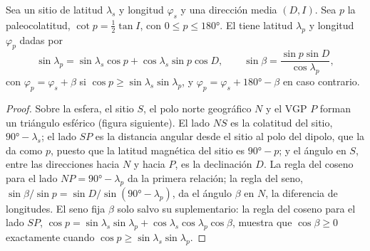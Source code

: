 \begin{theorem}\label{thm:b3:palaeomagnetism:pole}
Sea un sitio de latitud $\lambda_s$ y longitud $\varphi_s$ y una dirección media
$(D, I)$. Sea $p$ la paleocolatitud, $\cot p = \tfrac12\tan I$,
con $0 \le p \le \ang{180}$. El  tiene latitud
$\lambda_p$ y longitud $\varphi_p$ dadas por
\[
  \sin\lambda_p = \sin\lambda_s\cos p + \cos\lambda_s\sin p\cos D,\qquad
  \sin\beta = \frac{\sin p\sin D}{\cos\lambda_p},
\]
con $\varphi_p = \varphi_s + \beta$ si $\cos p \ge \sin\lambda_s\sin\lambda_p$,
y $\varphi_p = \varphi_s + \ang{180} - \beta$ en caso contrario.
\end{theorem}

\begin{proof}
Sobre la esfera, el sitio $S$, el polo norte geográfico $N$ y el VGP $P$ forman un
triángulo esférico (figura siguiente). El lado $NS$ es la colatitud del sitio,
$\ang{90} - \lambda_s$; el lado $SP$ es la distancia angular desde el sitio al
polo del dipolo, que la  da como $p$, puesto que la latitud
magnética del sitio es $\ang{90} - p$; y el ángulo en $S$, entre las
direcciones hacia $N$ y hacia $P$, es la declinación $D$. La regla del coseno para el
lado $NP = \ang{90} - \lambda_p$ da la primera relación; la regla del seno,
$\sin\beta/\sin p = \sin D/\sin(\ang{90} - \lambda_p)$, da el ángulo $\beta$
en $N$, la diferencia de longitudes. El seno fija $\beta$ solo salvo su
suplementario: la regla del coseno para el lado $SP$, $\cos p = \sin\lambda_s
\sin\lambda_p + \cos\lambda_s\cos\lambda_p\cos\beta$, muestra que $\cos\beta \ge
0$ exactamente cuando $\cos p \ge \sin\lambda_s\sin\lambda_p$.
\end{proof}

